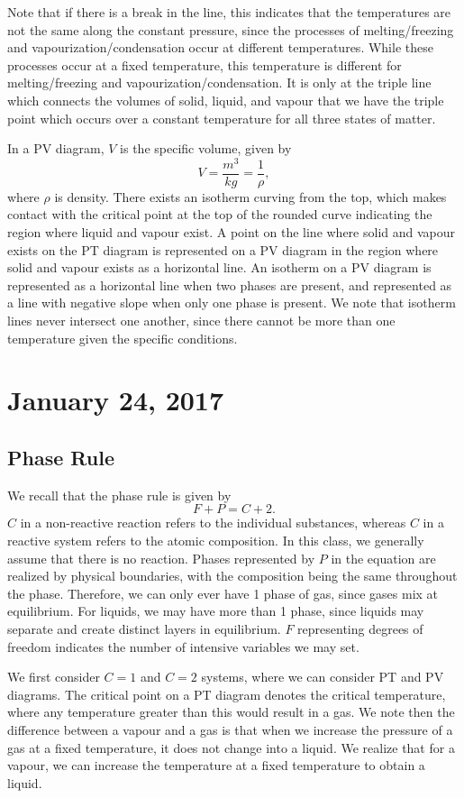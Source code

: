 \documentclass[11pt]{article}
\theoremstyle{plain} %
\theoremstyle{definition}
\theoremstyle{example}
\theoremstyle{remark}
\begin{document}
Note that if there is a break in the line, this indicates that the temperatures are not the same along the constant pressure, since the processes of melting/freezing and vapourization/condensation occur at different temperatures. While these processes occur at a fixed temperature, this temperature is different for melting/freezing and vapourization/condensation. It is only at the triple line which connects the volumes of solid, liquid, and vapour that we have the triple point which occurs over a constant temperature for all three states of matter. 

In a PV diagram, $V$ is the specific volume, given by 
$$V = \frac{m^3}{kg} = \frac{1}{\rho},$$
where $\rho$ is density. There exists an isotherm curving from the top, which makes contact with the critical point at the top of the rounded curve indicating the region where liquid and vapour exist. A point on the line where solid and vapour exists on the PT diagram is represented on a PV diagram in the region where solid and vapour exists as a horizontal line. An isotherm on a PV diagram is represented as a horizontal line when two phases are present, and represented as a line with negative slope when only one phase is present. We note that isotherm lines never intersect one another, since there cannot be more than one temperature given the specific conditions. 

\section{January 24, 2017}
\subsection{Phase Rule}

We recall that the phase rule is given by $$F + P = C +2.$$
 $C$ in a non-reactive reaction refers to the individual substances, whereas $C$ in a reactive system refers to the atomic composition. In this class, we generally assume that there is no reaction. Phases represented by $P$ in the equation are realized by physical boundaries, with the composition being the same throughout the phase. Therefore, we can only ever have 1 phase of gas, since gases mix at equilibrium. For liquids, we may have more than 1 phase, since liquids may separate and create distinct layers in equilibrium. $F$ representing degrees of freedom indicates the number of intensive variables we may set. 
 
 We first consider $C=1$ and $C=2$ systems, where we can consider PT and PV diagrams. The critical point on a PT diagram denotes the critical temperature, where any temperature greater than this would result in a gas. We note then the difference between a vapour and a gas is that when we increase the pressure of a gas at a fixed temperature, it does not change into a liquid. We realize that for a vapour, we can increase the temperature at a fixed temperature to obtain a liquid. 
\end{document}
